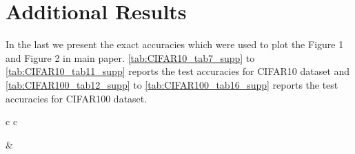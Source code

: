 \documentclass[10pt,twocolumn,letterpaper]{article}
\begin{document}
\section{Additional Results}
In the last we present the exact accuracies which were used to plot the Figure 1 and Figure 2 in main paper. \cref{tab:CIFAR10_tab7_supp} to \cref{tab:CIFAR10_tab11_supp} reports the test accuracies for CIFAR10 dataset and \cref{tab:CIFAR100_tab12_supp} to \cref{tab:CIFAR100_tab16_supp} reports the test accuracies for CIFAR100 dataset.  


\begin{table}[ht]
    \begin{center}
        \begin{tabular}{c c}
            
        \begin{minipage}{0.5\linewidth}   
        \centering
  
        \caption{CIFAR10 Test Accuracy on L$_{0}^{0}$. The base model accuracy is $69.16$.}
        
        \label{tab:CIFAR10_tab7_supp}
        
        
    \end{minipage} 
    
    &
    

\end{tabular}
\end{center}
\end{table}
\end{document}
